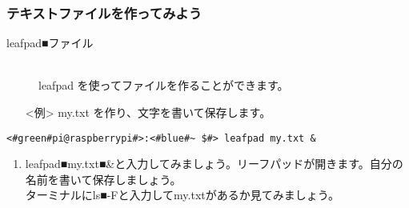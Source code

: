 \subsubsection{テキストファイルを作ってみよう}
\begin{description}
\item[leafpad■ファイル]\mbox{}\\
leafpad を使ってファイルを作ることができます。
\end{description}
\begin{itemize}
\item[<例>]my.txt を作り、文字を書いて保存します。
\end{itemize}
\begin{lstlisting}[caption=leafpadの例, label=leafpad]
<#green#pi@raspberrypi#>:<#blue#~ $#> leafpad my.txt &
\end{lstlisting}
\begin{tcolorbox}[title=\useOmetoi]
\begin{enumerate}
\item leafpad■my.txt■\&と入力してみましょう。リーフパッドが開きます。自分の名前を書いて保存しましょう。\\ターミナルにls■-Fと入力してmy.txtがあるか見てみましょう。\\
\end{enumerate}
\end{tcolorbox}